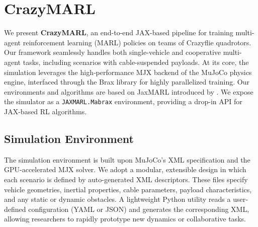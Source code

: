\chapter{CrazyMARL}
We present \textbf{CrazyMARL}, an end-to-end JAX-based pipeline for training multi-agent reinforcement learning (MARL) policies on teams of Crazyflie quadrotors. Our framework seamlessly handles both single-vehicle and cooperative multi-agent tasks, including scenarios with cable-suspended payloads. At its core, the simulation leverages the high‐performance MJX backend of the MuJoCo physics engine, interfaced through the Brax library for highly parallelized training. Our environments and algorithms are based on JaxMARL introduced by \autocite{flair2023jaxmarl}. We expose the simulator as a \texttt{JAXMARL.Mabrax} environment, providing a drop-in API for JAX-based RL algorithms.

\section{Simulation Environment}
The simulation environment is built upon MuJoCo's XML specification and the GPU-accelerated MJX solver. We adopt a modular, extensible design in which each scenario is defined by auto-generated XML descriptors. These files specify vehicle geometries, inertial properties, cable parameters, payload characteristics, and any static or dynamic obstacles. A lightweight Python utility reads a user‐defined configuration (YAML or JSON) and generates the corresponding XML, allowing researchers to rapidly prototype new dynamics or collaborative tasks. 
